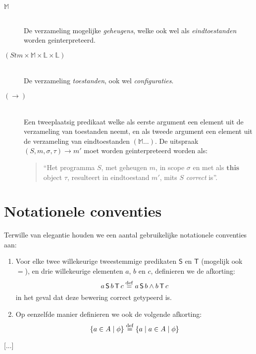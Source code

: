 \begin{description}
  \item[$\mathbb{M}$]\hfill\\ De verzameling mogelijke \emph{geheugens}, welke ook wel als \emph{eindtoestanden} worden geinterpreteerd.
  \item[$(\mathit{Stm} \times \mathbb{M} \times \mathbb{L} \times \mathbb{L})$]\hfill\\ De verzameling \emph{toestanden}, ook wel \emph{configuraties}.
  \item[$(\longrightarrow)$]\hfill\\ Een tweeplaatsig predikaat welke als eerste argument een element uit de verzameling van toestanden neemt, en als tweede argument een element uit de verzameling van eindtoestanden $(\mathbb{M}\dots)$. De uitspraak $(S, m, \sigma, \tau) \longrightarrow m'$ moet worden geinterpreteerd worden als:
  \begin{quote} ``Het programma $S$, met geheugen $m$, in scope $\sigma$ en met als $\mathbf{this}$ object $\tau$, resulteert in eindtoestand $m'$, mits $S$ \emph{correct} is''. \end{quote}
\end{description}

\section{Notationele conventies}

Terwille van elegantie houden we een aantal gebruikelijke notationele conventies aan:

\begin{enumerate}
  \item Voor elke twee willekeurige tweestemmige predikaten $\mathsf{S}$ en $\mathsf{T}$ (mogelijk ook $=$), en drie willekeurige elementen $a$, $b$ en $c$, definieren we de afkorting: $$a \operatorname{\mathsf{S}} b \operatorname{\mathsf{T}} c \buildrel{\mathrm{def}}\over{=} a \operatorname{\mathsf{S}} b \land b \operatorname{\mathsf{T}} c$$ in het geval dat deze bewering correct getypeerd is.
  \item Op eenzelfde manier definieren we ook de volgende afkorting: $$ \{a \in A \mid \phi \} \buildrel{\mathrm{def}}\over{=} \{a \mid a \in A \mid \phi\}$$
\end{enumerate}

[...]